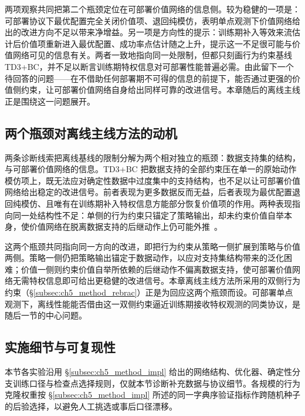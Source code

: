 两项观察共同把第二个瓶颈定位在可部署价值网络的信息侧。较为稳健的一项是：可部署协议下最优配置完全关闭价值项、退回纯模仿，表明单点观测下价值网络给出的改进方向不足以带来净增益。另一项是方向性的提示：训练期补入等效来流估计后价值项重新进入最优配置、成功率点估计随之上升，提示这一不足很可能与价值网络可见的信息有关。两者一致地指向同一处限制，但都只刻画行为约束基线 TD3+BC，并不足以断言训练期特权信息对可部署性能普遍必需。由此留下一个待回答的问题——在不借助任何部署期不可得的信息的前提下，能否通过更强的价值侧约束，让可部署价值网络自身给出同样可靠的改进信号。本章随后的离线主线正是围绕这一问题展开。

\subsection{两个瓶颈对离线主线方法的动机}\label{subsec:ch5_td3bc_transition}

两条诊断线索把离线基线的限制分解为两个相对独立的瓶颈：数据支持集的结构，与可部署价值网络的信息。TD3+BC 把数据支持的全部约束压在单一的原始动作模仿项上，既无法应对确定性数据中过度集中的支持结构，也不足以让可部署价值网络给出稳定的改进信号。前者表现为更多数据反而无益，后者表现为最优配置退回纯模仿、且唯有在训练期补入特权信息方能部分恢复价值项的作用。两种表现指向同一处结构性不足：单侧的行为约束只锚定了策略输出，却未约束价值自举本身，使价值网络在脱离数据支持的后继动作上仍可能外推~\citep{levine2020offline}。

这两个瓶颈共同指向同一方向的改进，即把行为约束从策略一侧扩展到策略与价值两侧。策略一侧仍把策略输出锚定于数据动作，以应对支持集结构带来的泛化困难；价值一侧则约束价值自举所依赖的后继动作不偏离数据支持，使可部署价值网络无需特权信息即可给出更稳健的改进信号。本章离线主线方法所采用的双侧行为约束（\S\ref{subsec:ch5_method_rebrac}）正是为回应这两个瓶颈而设。可部署单点观测下，离线性能能否借由这一双侧约束逼近训练期接收特权观测的同类协议，是随后一节的中心问题。

\subsection{实施细节与可复现性}\label{subsec:ch5_td3bc_impl}

本节各实验沿用 \S\ref{subsec:ch5_method_impl} 给出的网络结构、优化器、确定性分支训练口径与检查点选择规则，仅就本节诊断补充数据与协议细节。各规模的行为克隆权重按 \S\ref{subsec:ch5_method_impl} 所述的同一字典序验证指标作跨随机种子的后验选择，以避免人工挑选或事后口径漂移。

